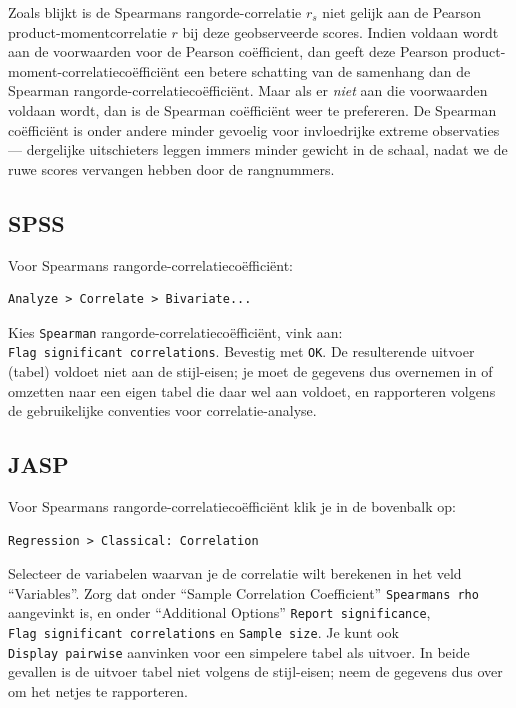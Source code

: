 \documentclass[
]{book}
\begin{document}
Zoals blijkt is de Spearmans rangorde-correlatie \(r_s\) niet gelijk aan
de Pearson product-momentcorrelatie \(r\) bij deze geobserveerde scores.
Indien voldaan wordt aan de voorwaarden voor de Pearson coëfficient, dan
geeft deze Pearson product-moment-correlatiecoëfficiënt een betere
schatting van de samenhang dan de Spearman
rangorde-correlatiecoëfficiënt. Maar als er \emph{niet} aan die voorwaarden
voldaan wordt, dan is de Spearman coëfficiënt weer te prefereren. De
Spearman coëfficiënt is onder andere minder gevoelig voor invloedrijke
extreme observaties --- dergelijke uitschieters leggen immers minder
gewicht in de schaal, nadat we de ruwe scores vervangen hebben door de
rangnummers.

\hypertarget{spss-7}{%
\subsection{SPSS}\label{spss-7}}

Voor Spearmans rangorde-correlatiecoëfficiënt:

\begin{verbatim}
Analyze > Correlate > Bivariate...
\end{verbatim}

Kies \texttt{Spearman} rangorde-correlatiecoëfficiënt, vink aan:
\texttt{Flag\ significant\ correlations}. Bevestig met \texttt{OK}. De resulterende
uitvoer (tabel) voldoet niet aan de stijl-eisen; je moet de gegevens dus
overnemen in of omzetten naar een eigen tabel die daar wel aan voldoet,
en rapporteren volgens de gebruikelijke conventies voor
correlatie-analyse.

\hypertarget{jasp-9}{%
\subsection{JASP}\label{jasp-9}}

Voor Spearmans rangorde-correlatiecoëfficiënt klik je in de bovenbalk op:

\begin{verbatim}
Regression > Classical: Correlation
\end{verbatim}

Selecteer de variabelen waarvan je de correlatie wilt berekenen in het veld ``Variables''. Zorg dat onder ``Sample Correlation Coefficient'' \texttt{Spearman\textquotesingle{}s\ rho} aangevinkt is, en onder ``Additional Options'' \texttt{Report\ significance}, \texttt{Flag\ significant\ correlations} en \texttt{Sample\ size}. Je kunt ook \texttt{Display\ pairwise} aanvinken voor een simpelere tabel als uitvoer. In beide gevallen is de uitvoer tabel niet volgens de stijl-eisen; neem de gegevens dus over om het netjes te rapporteren.
\end{document}
